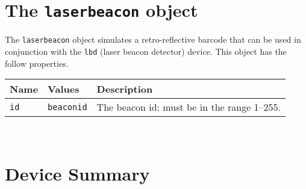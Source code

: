 \documentclass[11pt,twoside]{report}
\begin{document}
\newpage
\section{The {\tt laserbeacon} object}

The {\tt laserbeacon} object simulates a retro-reflective barcode
that can be used in conjunction with the {\tt lbd} (laser beacon detector)
device.  This object has the follow properties.
\vspace{1em}\\\noindent
\begin{tabularx}{\columnwidth}{llX}
\hline
Name & Values & Description \\
\hline

\verb'id' & \verb'beaconid' & The beacon id; must be in the range 1--255. \\

\hline
\end{tabularx}
\vspace{1em}\\


\newpage
\section{Device Summary}
\label{sec.ref.devices}
\end{document}
